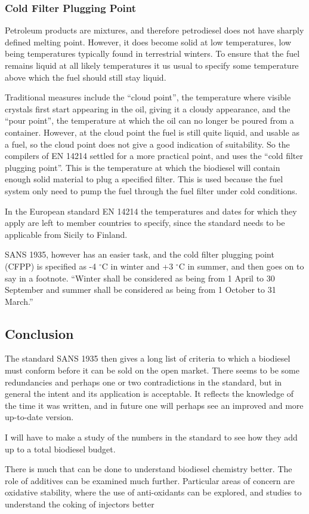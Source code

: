 \subsubsection{Cold Filter Plugging Point}

Petroleum products are mixtures, and therefore petrodiesel does not have sharply defined melting point. However, it does become solid at low temperatures, low being temperatures typically found in terrestrial winters. To ensure that the fuel remains liquid at all likely temperatures it us usual to specify some temperature above which the fuel should still stay liquid. 

Traditional measures include the ``cloud point'', the temperature where visible crystals first start appearing in the oil, giving it a cloudy appearance, and the ``pour point'', the temperature at which the oil can no longer be poured from a container. However, at the cloud point the fuel is still quite liquid, and usable as a fuel, so the cloud point does not give a good indication of suitability. So the compilers of EN 14214 settled for a more practical point, and uses the ``cold filter plugging point''. This is the temperature at which the biodiesel will contain enough solid material to plug a specified filter. This is used because the fuel system only need to pump the fuel through the fuel filter under cold conditions. 

In the European standard EN 14214 the temperatures and dates for which they apply are left to member countries to specify, since the standard needs to be applicable from Sicily to Finland.

SANS 1935, however has an easier task, and the cold filter plugging point (CFPP) is specified as -4 $^\circ$C in winter and +3 $^\circ$C in summer, and then goes on to say in a footnote. ``Winter shall be considered as being from 1 April to 30 September and summer shall be considered as being from 1 October to 31 March.''

\subsection{Conclusion}

The standard SANS 1935 then gives a long list of criteria to which a biodiesel must conform before it can be sold on the open market. There seems to be some redundancies and perhaps one or two contradictions in the standard, but in general the intent and its application is acceptable. It reflects the knowledge of the time it was written, and in future one will perhaps see an improved and more up-to-date version.

I will have to make a study of the numbers in the standard to see how they add up to a total biodiesel budget.

There is much that can be done to understand biodiesel chemistry better. The role of additives can be examined much further. Particular areas of concern are oxidative stability, where the use of anti-oxidants can be explored, and studies to understand the coking of injectors better

